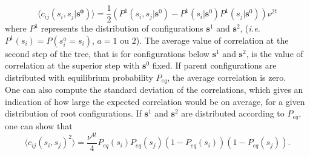 \documentclass[10pt]{article}
\newcommand{\ie}{\emph{i.e.}$\;$}
\begin{document}
\begin{equation}
	\langle c_{ij}(s_i,s_j\vert \mathbf{s^0})\rangle = \frac{1}{2}\left(P^1(s_i,s_j\vert \mathbf{s}^0) - P^1(s_i\vert \mathbf{s}^0)P^1(s_j\vert \mathbf{s}^0) \right)\nu^{2t}
\end{equation}
where $P^1$ represents the distribution of configurations $\mathbf{s}^1$ and $\mathbf{s}^2$, (\ie $P^1(s_i) = P(s_i^a=s_i)$, $a=1$ ou $2$). The average value of correlation at the second step of the tree, that is for configurations below $\mathbf{s}^1$ and $\mathbf{s}^2$, is the value of correlation at the superior step with $\mathbf{s}^0$ fixed. If parent configurations are distributed with equilibrium probability $P_{eq}$, the average correlation is zero.\\
One can also compute the standard deviation of the correlations, which gives an indication of how large the expected correlation would be on average, for a given distribution of root configurations. If $\mathbf{s}^1$ and $\mathbf{s}^2$ are distributed according to $P_{eq}$, one can show that 
\begin{equation}
	\langle c_{ij}(s_i,s_j)^2 \rangle = \frac{\nu^{4t}}{4}P_{eq}(s_i)P_{eq}(s_j)(1-P_{eq}(s_i))(1-P_{eq}(s_j)).
\end{equation}



\end{document}
